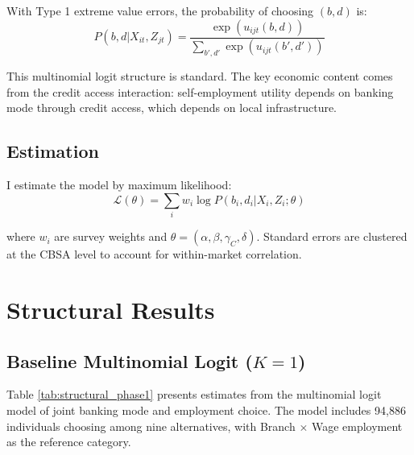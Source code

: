 \documentclass[12pt]{article}
\begin{document}
With Type 1 extreme value errors, the probability of choosing $(b,d)$ is:
\begin{equation}
P(b,d | X_{it}, Z_{jt}) = \frac{\exp\left( u_{ijt}(b,d) \right)}{\sum_{b',d'} \exp\left( u_{ijt}(b',d') \right)}
\end{equation}

This multinomial logit structure is standard. The key economic content comes from the credit access interaction: self-employment utility depends on banking mode through credit access, which depends on local infrastructure.

\subsection{Estimation}

I estimate the model by maximum likelihood:
\begin{equation}
\mathcal{L}(\theta) = \sum_i w_i \log P(b_i, d_i | X_i, Z_i; \theta)
\end{equation}

where $w_i$ are survey weights and $\theta = (\alpha, \beta, \gamma_C, \delta)$. Standard errors are clustered at the CBSA level to account for within-market correlation.

\section{Structural Results}

\subsection{Baseline Multinomial Logit ($K=1$)}

Table \ref{tab:structural_phase1} presents estimates from the multinomial logit model of joint banking mode and employment choice. The model includes 94,886 individuals choosing among nine alternatives, with Branch $\times$ Wage employment as the reference category.
\end{document}
